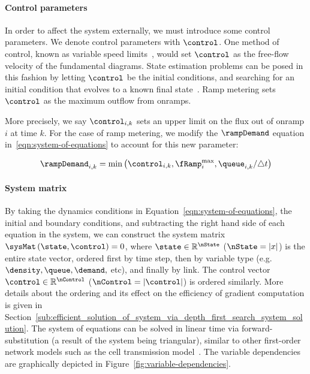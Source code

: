 \paragraph*{Control parameters} %
\label{sub:control_parameters}

In order to affect the system externally, we must introduce some control parameters. We denote control parameters with $\control$. One method of control, known as variable speed limits~\cite{Muralidharan2009}, would set $\control$ as the free-flow velocity of the fundamental diagrams. State estimation problems can be posed in this fashion by letting $\control$ be the initial conditions, and searching for an initial condition that evolves to a known final state~\cite{Jacquet}. Ramp metering sets $\control$ as the maximum outflow from onramps. 

More precisely, we say $\idx{\control}{i}{k}$ sets an upper limit on the flux out of onramp $i$ at time $k$. For the case of ramp metering, we modify the $\rampDemand$ equation in~\eqref{eqn:system-of-equations} to account for this new parameter:

\begin{equation}
\label{eqn:modified-ramp-demand}
\idx{\rampDemand}{i}{k} = 
\min\left( \idx{\control}{i}{k}, \rampMax_i, \idx{\queue}{i}{k} / \dt \right)
\end{equation}

\paragraph*{System matrix}

By taking the dynamics conditions in Equation~\eqref{eqn:system-of-equations}, the initial and boundary conditions, and subtracting the right hand side of each equation in the system, we can construct the system matrix $\sysMat \left( \state, \control \right) = 0$, where $\state\in\Rbb^{\nState}$ ($\nState=|x|$) is the entire state vector, ordered first by time step, then by variable type (e.g. $\density, \queue, \demand,$ etc), and finally by link. The control vector $\control\in\Rbb^{\nControl}$ ($\nControl = |\control|$) is ordered similarly. More details about the ordering and its effect on the efficiency of gradient computation is given in Section~\ref{sub:efficient_solution_of_system_via_depth_first_search_system_solution}. The system of equations can be solved in linear time via forward-substitution (a result of the system being triangular), similar to other first-order network models such as the cell transmission model~\cite{daganzo1995cell}. The variable dependencies are graphically depicted in Figure~\ref{fig:variable-dependencies}.


